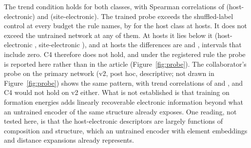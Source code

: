The trend condition holds for both classes, with Spearman correlations of \numProbeCFourVOneRuleHostTrendRho{}
\ci{\numProbeCFourVOneRuleHostTrendCiNinetyFiveItemOne{}}{\numProbeCFourVOneRuleHostTrendCiNinetyFiveItemTwo{}}
(host-electronic) and \numProbeCFourVOneRuleSiteTrendRho{}
\ci{\numProbeCFourVOneRuleSiteTrendCiNinetyFiveItemOne{}}{\numProbeCFourVOneRuleSiteTrendCiNinetyFiveItemTwo{}}
(site-electronic). The trained probe exceeds the shuffled-label control at every budget the rule names, by
\numProbeCFourVOneRuleHostControlsSixHundredFiftyFourShuffledMean{}
\ci{\numProbeCFourVOneRuleHostControlsSixHundredFiftyFourShuffledCiNinetyFiveItemOne{}}{\numProbeCFourVOneRuleHostControlsSixHundredFiftyFourShuffledCiNinetyFiveItemTwo{}}
for the host class at \numCfgBudgetsHostsItemSix{} hosts. It does not exceed the untrained network at any of them.
At \numCfgBudgetsHostsItemFour{} hosts it lies below it (host-electronic
\numProbeCFourVOneRuleHostControlsTwoHundredInitZeroMean{}
\ci{\numProbeCFourVOneRuleHostControlsTwoHundredInitZeroCiNinetyFiveItemOne{}}{\numProbeCFourVOneRuleHostControlsTwoHundredInitZeroCiNinetyFiveItemTwo{}},
site-electronic \numProbeCFourVOneRuleSiteControlsTwoHundredInitZeroMean{}
\ci{\numProbeCFourVOneRuleSiteControlsTwoHundredInitZeroCiNinetyFiveItemOne{}}{\numProbeCFourVOneRuleSiteControlsTwoHundredInitZeroCiNinetyFiveItemTwo{}}),
and at \numCfgBudgetsHostsItemSix{} hosts the differences are
\numProbeCFourVOneRuleHostControlsSixHundredFiftyFourInitZeroMean{}
\ci{\numProbeCFourVOneRuleHostControlsSixHundredFiftyFourInitZeroCiNinetyFiveItemOne{}}{\numProbeCFourVOneRuleHostControlsSixHundredFiftyFourInitZeroCiNinetyFiveItemTwo{}}
and \numProbeCFourVOneRuleSiteControlsSixHundredFiftyFourInitZeroMean{}
\ci{\numProbeCFourVOneRuleSiteControlsSixHundredFiftyFourInitZeroCiNinetyFiveItemOne{}}{\numProbeCFourVOneRuleSiteControlsSixHundredFiftyFourInitZeroCiNinetyFiveItemTwo{}},
intervals that include zero. C4 therefore does not hold, and under the registered rule the probe is reported here
rather than in the article (Figure~\ref{fig:probe}). The collaborator's probe on the primary network (v2, post hoc,
descriptive; not drawn in Figure~\ref{fig:probe}) shows the same pattern, with trend correlations of \numProbeDescriptiveSVTwoHostRuleTrendRho{} and
\numProbeDescriptiveSVTwoSiteRuleTrendRho{}, and C4 would not hold on v2 either. What is not established is that
training on formation energies adds linearly recoverable electronic information beyond what an untrained encoder of
the same structure already exposes. One reading, not tested here, is that the host-electronic descriptors are
largely functions of composition and structure, which an untrained encoder with element embeddings and distance
expansions already represents.


